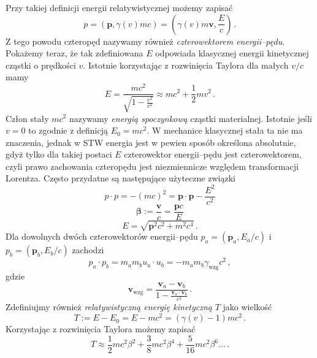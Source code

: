 \documentclass[../main.tex]{subfiles}
\begin{document}
\noindent Przy takiej definicji energii relatywistycznej możemy zapisać
\begin{equation*}
    p=(\mathbf{p},\gamma(v)mc)=\left(\gamma(v)m\mathbf{v},\frac{E}{c}\right)\,.
\end{equation*}
Z tego powodu czteropęd nazywamy również \textit{czterowektorem energii--pędu}. Pokażemy teraz, że
tak zdefiniowana \(E\) odpowiada klasycznej energii kinetycznej cząstki o prędkości \(v\). Istotnie
korzystając z rozwinięcia Taylora dla małych \(v/c\) mamy
\begin{equation*}
    E=\frac{mc^2}{\sqrt{1-\frac{v^2}{c^2}}}\approx mc^2+\frac{1}{2}mv^2\,.
\end{equation*}
Człon stały \(mc^2\) nazywamy \textit{energią spoczynkową} cząstki materialnej. Istotnie jeśli
\(v=0\) to zgodnie z definicją \(E_0=mc^2\). W mechanice klasycznej stała ta nie ma znaczenia,
jednak w STW energia jest w pewien sposób określona absolutnie, gdyż tylko dla takiej postaci \(E\)
czterowektor energii--pędu jest czterowektorem, czyli prawo zachowania czteropędu jest niezmiennicze
względem transformacji Lorentza. Często przydatne są następujące użyteczne związki
\begin{equation*}
    p\cdot p=-(mc)^2=\mathbf{p}\cdot\mathbf{p}-\frac{E^2}{c^2}
\end{equation*}
\begin{equation*}
    \boldsymbol{\beta}:=\frac{\mathbf{v}}{c}=\frac{\mathbf{p}c}{E}
\end{equation*}
\begin{equation*}
    E=\sqrt{\mathbf{p}^2c^2+m^2c^4}\,.
\end{equation*}
Dla dowolnych dwóch czterowektorów energii--pędu \(p_a=(\mathbf{p}_a,E_a/c)\) i
\(p_b=(\mathbf{p}_b,E_b/c)\) zachodzi
\begin{equation*}
    p_a\cdot p_b=m_am_bu_a\cdot u_b=-m_am_b\gamma_\text{wzg}c^2\,,
\end{equation*}
gdzie
\begin{equation*}
    \mathbf{v}_\text{wzg}=\frac{\mathbf{v}_a-\mathbf{v}_b}{1-\frac{\mathbf{v}_a\cdot\mathbf{v}_b}{c^2}}\,.
\end{equation*}
Zdefiniujmy również \textit{relatywistyczną energię kinetyczną} \(T\) jako wielkość
\begin{equation*}
    T:=E-E_0=E-mc^2=(\gamma(v)-1)mc^2\,.
\end{equation*}
Korzystając z rozwinięcia Taylora możemy zapisać
\begin{equation*}
    T\approx \frac{1}{2}mc^2\beta^2+\frac{3}{8}mc^2\beta^4+\frac{5}{16}mc^2\beta^6\dotso\,.
\end{equation*}
\end{document}
